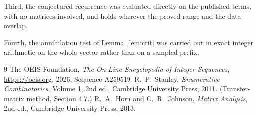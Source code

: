 \documentclass[11pt,a4paper]{article}
\theoremstyle{plain}
\theoremstyle{definition}
\begin{document}
Third, the conjectured recurrence was evaluated directly on the published terms, with no
matrices involved, and holds wherever the proved range and the data overlap.

Fourth, the annihilation test of Lemma~\ref{lem:crit} was carried out in exact integer
arithmetic on the whole vector rather than on a sampled prefix.

\begin{thebibliography}{9}
 The OEIS Foundation, \emph{The On-Line Encyclopedia of Integer
Sequences}, \url{https://oeis.org}, 2026. Sequence A259519.
 R.~P.~Stanley, \emph{Enumerative Combinatorics}, Volume 1, 2nd ed.,
Cambridge University Press, 2011. (Transfer-matrix method, Section 4.7.)
 R.~A.~Horn and C.~R.~Johnson, \emph{Matrix Analysis}, 2nd ed., Cambridge
University Press, 2013.
\end{thebibliography}
\end{document}
